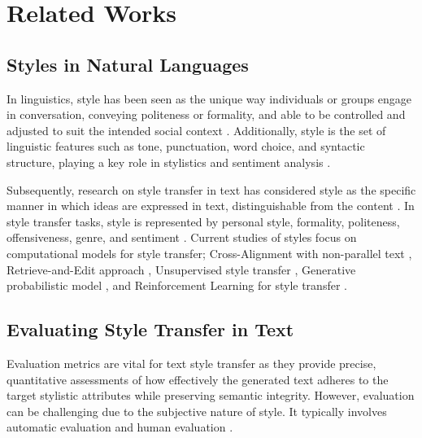 \section{Related Works}\label{sec:related_works}

\subsection{Styles in Natural Languages}
In linguistics, style has been seen as the unique way individuals or groups engage in conversation, conveying politeness or formality, and able to be controlled and adjusted to suit the intended social context \cite{Labov1997}. Additionally, style is the set of linguistic features such as tone, punctuation, word choice, and syntactic structure, playing a key role in stylistics and sentiment analysis \cite{pang}. 

Subsequently, research on style transfer in text has considered style as the specific manner in which ideas are expressed in text, distinguishable from the content \cite{shen}. In style transfer tasks, style is represented by personal style, formality, politeness, offensiveness, genre, and sentiment \cite{Toshevska_2022}. Current studies of styles focus on computational models for style transfer; Cross-Alignment with non-parallel text \cite{shen}, Retrieve-and-Edit approach \cite{li-etal-2018-delete}, Unsupervised style transfer \cite{prabhumoye-etal-2018-style}, Generative probabilistic model \cite{he2020probabilisticformulationunsupervisedtext}, and Reinforcement Learning for style transfer \cite{gong2019reinforcementlearningbasedtext}.

\subsection{Evaluating Style Transfer in Text}
Evaluation metrics are vital for text style transfer as they provide precise, quantitative assessments of how effectively the generated text adheres to the target stylistic attributes while preserving semantic integrity. However, evaluation can be challenging due to the subjective nature of style. It typically involves automatic evaluation and human evaluation \cite{jin-etal-2022-deep}.

